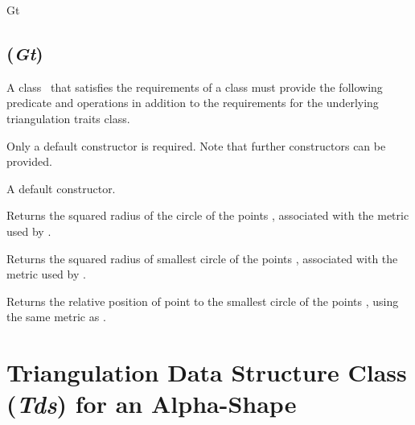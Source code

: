 \begin{ccClass} {Gt}
\subsection*{\protect {} (\mbox{\it Gt})}


\ccDefinition
A class \ccClassName\ that satisfies the requirements of a
 class must provide the following predicate and
operations in addition to the requirements for the underlying triangulation
traits class.

\ccTypes


\ccCreation

Only a default constructor is required. Note that further constructors
can be provided. 

{A default constructor.}


{Returns the squared radius of the circle of the
points , associated with the metric 
used by .}

{Returns the squared radius of smallest  circle of the
points , associated with the metric 
used by .}


{Returns the relative position of point  to the smallest circle of
the points , using the same metric as .}

\end{ccClass}


\section*{Triangulation Data Structure Class (\mbox{\it Tds}) for an Alpha-Shape}

